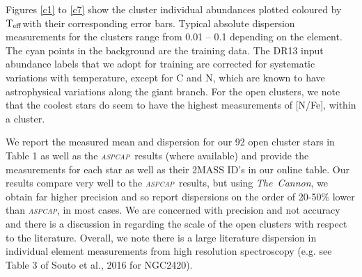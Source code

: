 \documentclass[14pt, preprint2]{aastex6}
\newcommand{\project}[1]{\textsl{#1}}
\newcommand{\tc}{\project{The~Cannon}}
\newcommand{\aspcap}{\project{\textsc{aspcap}}}
\newcommand{\teff}{\mbox{$\rm T_{eff}$}}
\begin{document}
Figures \ref{c1} to \ref{c7} show the cluster individual abundances plotted coloured by \teff with their corresponding error bars. Typical absolute dispersion measurements for the clusters range from 0.01 -- 0.1 depending on the element.  The cyan points in the background are the training data. The DR13 input abundance labels that we adopt for training are corrected for systematic variations with temperature, except for C and N, which are known to have astrophysical variations along the giant branch. For the open clusters, we note that the coolest stars do seem to have the highest measurements of [N/Fe], within a cluster. 

We report the measured mean and dispersion for our 92 open cluster stars in Table 1 as well as the \aspcap\ results (where available) and provide the measurements for each star as well as their 2MASS ID's in our online table. Our results compare very well to the \aspcap\ results, but using \tc, we obtain far higher precision and so report dispersions on the order of 20-50\% lower than \aspcap, in most cases. We are concerned with precision and not accuracy and there is a discussion in \citet{Holtzman2016} regarding the scale of the open clusters with respect to the literature. Overall, we note there is a large literature dispersion in individual element measurements from high resolution spectroscopy (e.g. see Table 3 of Souto et al., 2016 for NGC2420). 
\end{document}
